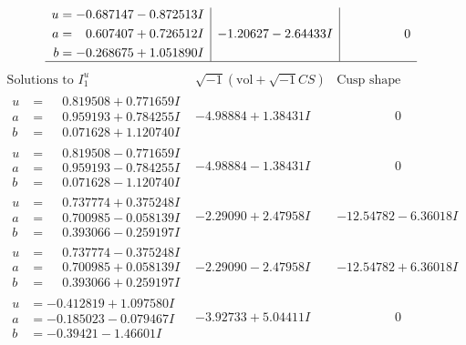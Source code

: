 \documentclass[1p]{elsarticle_modified}
\theoremstyle{definition}
\newcommand{\I}{\sqrt{-1}}
\begin{document}
$$\begin{array}{c|c|c}
\begin{aligned}
u &= -0.687147 - 0.872513 I \\
a &= \phantom{-}0.607407 + 0.726512 I \\
b &= -0.268675 + 1.051890 I\end{aligned}
 & -1.20627 - 2.64433 I & \phantom{-0.000000 } 0\\
 \hline 
 \end{array}$$\newpage$$\begin{array}{c|c|c}  
\text{Solutions to }I^u_{1}& \I (\text{vol} + \sqrt{-1}CS) & \text{Cusp shape}\\
 \hline 
\begin{aligned}
u &= \phantom{-}0.819508 + 0.771659 I \\
a &= \phantom{-}0.959193 + 0.784255 I \\
b &= \phantom{-}0.071628 + 1.120740 I\end{aligned}
 & -4.98884 + 1.38431 I & \phantom{-0.000000 } 0 \\ \hline\begin{aligned}
u &= \phantom{-}0.819508 - 0.771659 I \\
a &= \phantom{-}0.959193 - 0.784255 I \\
b &= \phantom{-}0.071628 - 1.120740 I\end{aligned}
 & -4.98884 - 1.38431 I & \phantom{-0.000000 } 0 \\ \hline\begin{aligned}
u &= \phantom{-}0.737774 + 0.375248 I \\
a &= \phantom{-}0.700985 - 0.058139 I \\
b &= \phantom{-}0.393066 - 0.259197 I\end{aligned}
 & -2.29090 + 2.47958 I & -12.54782 - 6.36018 I \\ \hline\begin{aligned}
u &= \phantom{-}0.737774 - 0.375248 I \\
a &= \phantom{-}0.700985 + 0.058139 I \\
b &= \phantom{-}0.393066 + 0.259197 I\end{aligned}
 & -2.29090 - 2.47958 I & -12.54782 + 6.36018 I \\ \hline\begin{aligned}
u &= -0.412819 + 1.097580 I \\
a &= -0.185023 - 0.079467 I \\
b &= -0.39421 - 1.46601 I\end{aligned}
 & -3.92733 + 5.04411 I & \phantom{-0.000000 } 0 \\ \hline\begin{aligned}

\end{aligned}
\end{array}$$
\end{document}
